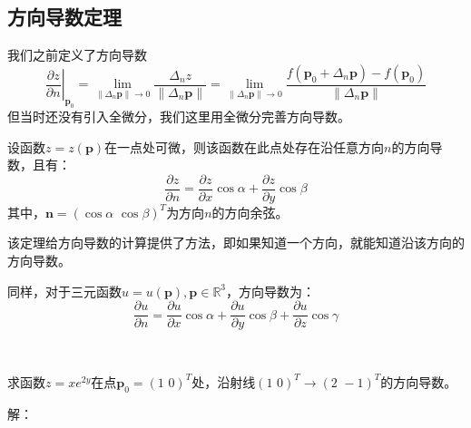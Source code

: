 \subsection{方向导数定理}

我们之前定义了方向导数
\[
\left. \frac{\partial z}{\partial n} \right|_{\boldsymbol{p}_0}=\underset{\left\| \Delta _n\boldsymbol{p} \right\| \rightarrow 0}{\lim}\frac{\Delta _nz}{\left\| \Delta _n\boldsymbol{p} \right\|}=\underset{\left\| \Delta _n\boldsymbol{p} \right\| \rightarrow 0}{\lim}\frac{f\left( \boldsymbol{p}_0+\Delta _n\boldsymbol{p} \right) -f\left( \boldsymbol{p}_0 \right)}{\left\| \Delta _n\boldsymbol{p} \right\|}
\]
但当时还没有引入全微分，我们这里用全微分完善方向导数。

\begin{theorem}[方向导数定理]
设函数$z=z\left( \boldsymbol{p} \right) $在一点处可微，则该函数在此点处存在沿任意方向$n$的方向导数，且有：
\[
\frac{\partial z}{\partial n}=\frac{\partial z}{\partial x}\cos \alpha +\frac{\partial z}{\partial y}\cos \beta
\]
其中，$\mathbf{n}=\left( \cos \alpha \,\,\cos \beta \right) ^T$为方向$n$的方向余弦。
\end{theorem}

该定理给方向导数的计算提供了方法，即如果知道一个方向，就能知道沿该方向的方向导数。

同样，对于三元函数$u=u\left( \boldsymbol{p} \right) ,\boldsymbol{p}\in \mathbb{R} ^3$，方向导数为：
\[
\frac{\partial u}{\partial n}=\frac{\partial u}{\partial x}\cos \alpha +\frac{\partial u}{\partial y}\cos \beta +\frac{\partial u}{\partial z}\cos \gamma
\]

~

\begin{example}
求函数$z=xe^{2y}$在点$\boldsymbol{p}_0=\left( 1\,\,0 \right) ^T$处，沿射线$\left( 1\,\,0 \right) ^T\rightarrow \left( 2\,\,-1 \right) ^T$的方向导数。
\end{example}

解：

